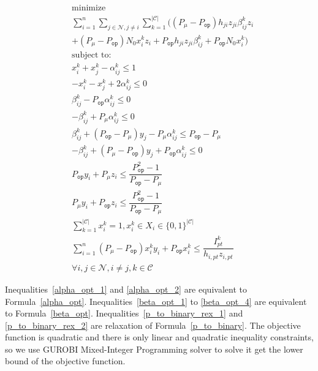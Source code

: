 \documentclass[times]{ettauth}
\theoremstyle{mytheoremstyle}
\theoremstyle{mytheoremstyle}
\theoremstyle{mytheoremstyle}
\begin{document}
			\begin{align}
			\label{scheme2optimizaiton}
			& \underset{}{\text{minimize}}\\
			&\sum\limits^{n}_{i=1}\sum\limits_{j\in\mathcal{N}, j\neq i}\sum\limits_{k=1}^{|\mathcal{C}|} ((P_\mu - P_{\mathtt{op}})h_{ji} z_{ji} \beta_{ij}^k z_i  \\
			&  + (P_\mu - P_{\mathtt{op}})N_0  x_i^k z_i + P_{\mathtt{op}}h_{ji} z_{ji} \beta_{ij}^k +  P_{\mathtt{op}}N_0x_i^k)\\
			& \text{subject to:} \\
			& x_i^k + x_j^k  - \alpha_{ij}^k\leq 1 \label{alpha_opt_1}\\
			& - x_i^k - x_j^k + 2 \alpha_{ij}^k \leq 0 \label{alpha_opt_2} \\
			& \beta_{ij}^k - P_{\mathtt{op}} \alpha_{ij}^k \leq 0 \label{beta_opt_1}\\
			& - \beta_{ij}^k + P_\mu \alpha_{ij}^k \leq 0 \label{beta_opt_2}\\
			& \beta_{ij}^k + (P_{\mathtt{op}} - P_\mu)y_j - P_\mu \alpha_{ij}^k \leq P_{\mathtt{op}}- P_\mu \label{beta_opt_3}\\	
			& -\beta_{ij}^k + (P_\mu - P_{\mathtt{op}})y_j + P_{\mathtt{op}} \alpha_{ij}^k \leq 0 \label{beta_opt_4}\\					
			& P_{\mathtt{op}} y_i + P_\mu z_i  \leq \dfrac{P_{\mathtt{op}}^2-1}{P_{\mathtt{op}} - P_\mu}\label{p_to_binary_rex_1}\\
			& P_\mu y_i + P_{\mathtt{op}} z_i  \leq \dfrac{P_{\mathtt{op}}^2-1}{P_{\mathtt{op}} - P_\mu} \label{p_to_binary_rex_2}\\
			& \sum\limits_{k=1}^{|\mathcal{C}|}x_i^k=1, x_i^k\in X_i\in \{0,1\}^{|\mathcal{C}|}\\
			& \sum\limits^{n}_{i=1} (P_\mu - P_{\mathtt{op}})x_i^k y_i + P_{\mathtt{op}}x_i^k \leq  \dfrac{I^k_{pt}}{h_{i,pt} z_{i,pt}}\\
			& \forall i, j\in \mathcal{N}, i\neq j, k\in \mathcal{C}
			\end{align}


Inequalities~\ref{alpha_opt_1} and \ref{alpha_opt_2} are equivalent to Formula~\ref{alpha_opt}.
Inequalities~\ref{beta_opt_1} to \ref{beta_opt_4} are equivalent to Formula~\ref{beta_opt}.
Inequalities~\ref{p_to_binary_rex_1} and \ref{p_to_binary_rex_2} are relaxation of Formula~\ref{p_to_binary}.
The objective function is quadratic and there is only linear and quadratic inequality constraints, so we use GUROBI Mixed-Integer Programming solver to solve it get the lower bound of the objective function.
\end{document}
